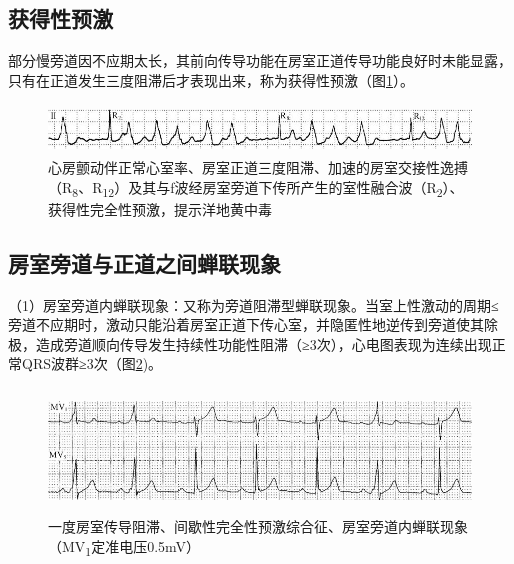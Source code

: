 \protect\hypertarget{text00036.htmlux5cux23subid428}{}{}

\subsection{获得性预激}

部分慢旁道因不应期太长，其前向传导功能在房室正道传导功能良好时未能显露，只有在正道发生三度阻滞后才表现出来，称为获得性预激（图\ref{fig29-9}）。

\begin{figure}[!htbp]
 \centering
 \includegraphics[width=5.61458in,height=0.51042in]{./images/Image00493.jpg}
 \captionsetup{justification=centering}
 \caption{心房颤动伴正常心室率、房室正道三度阻滞、加速的房室交接性逸搏（R\textsubscript{8}、R\textsubscript{12}）及其与f波经房室旁道下传所产生的室性融合波（R\textsubscript{2}）、获得性完全性预激，提示洋地黄中毒
 }
 \label{fig29-9}
  \end{figure} 

\protect\hypertarget{text00036.htmlux5cux23subid429}{}{}

\subsection{房室旁道与正道之间蝉联现象}

（1）房室旁道内蝉联现象：又称为旁道阻滞型蝉联现象。当室上性激动的周期≤旁道不应期时，激动只能沿着房室正道下传心室，并隐匿性地逆传到旁道使其除极，造成旁道顺向传导发生持续性功能性阻滞（≥3次），心电图表现为连续出现正常QRS波群≥3次（图\ref{fig29-10})。

\begin{figure}[!htbp]
 \centering
 \includegraphics[width=5.58333in,height=1.30208in]{./images/Image00494.jpg}
 \captionsetup{justification=centering}
 \caption{一度房室传导阻滞、间歇性完全性预激综合征、房室旁道内蝉联现象（MV\textsubscript{1}定准电压0.5mV）}
 \label{fig29-10}
  \end{figure} 


